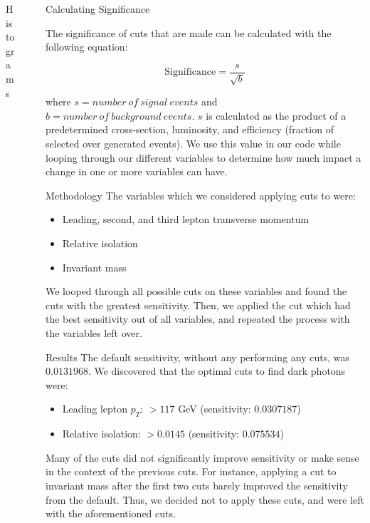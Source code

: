 \documentclass[final]{beamer}
\newlength{\sepwidth}
\newlength{\colwidth}
\newcommand{\separatorcolumn}{\begin{column}{\sepwidth}\end{column}}
\begin{document}
\begin{frame}[t]
\begin{columns}[t]
\begin{column}{\colwidth}
\begin{block}{Histograms}
    
  \end{block}

\end{column}

\separatorcolumn

\begin{column}{\colwidth}

  \begin{block}{Calculating Significance}

    The significance of cuts that are made can be calculated with the following equation:

    $$
    \text{Significance} = \frac{s}{\sqrt{b}}
    $$
    
    where $s = number\ of\ signal\ events$ and $b = number\ of\ background\ events$. $s$ is calculated as the product of a predetermined cross-section, luminosity, and efficiency (fraction of selected over generated events). We use this value in our code while looping through our different variables to determine how much impact a change in one or more variables can have.


  \end{block}
  \begin{block}{Methodology}
    The variables which we considered applying cuts to were:
    \begin{itemize}
        \item Leading, second, and third lepton transverse momentum
        \item Relative isolation
        \item Invariant mass
    \end{itemize}
    We looped through all possible cuts on these variables and found the cuts with the greatest sensitivity. Then, we applied the cut which had the best sensitivity out of all variables, and repeated the process with the variables left over. 
  \end{block}
  \begin{block}{Results}
    The default sensitivity, without any performing any cuts, was $0.0131968$.
    We discovered that the optimal cuts to find dark photons were:
    \begin{itemize}
        \item Leading lepton $p_{T}$: $>117$ GeV (sensitivity: $0.0307187$)
        \item Relative isolation: $>0.0145$ (sensitivity: $0.075534$)
    \end{itemize}
    Many of the cuts did not significantly improve sensitivity or make sense in the context of the previous cuts. For instance, applying a cut to invariant mass after the first two cuts barely improved the sensitivity from the default. Thus, we decided not to apply these cuts, and were left with the aforementioned cuts.
  \end{block}



\end{column}
\end{columns}
\end{frame}
\end{document}
